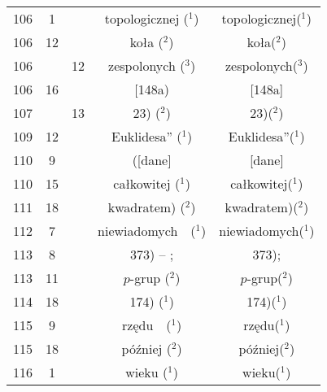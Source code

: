 \documentclass[a4paper,11pt]{article}
\begin{document}
\begin{center}
\begin{tabular}{|c|c|c|c|c|}
    106 &  1 & & topologicznej ($^{ 1 }$) & topologicznej($^{ 1 }$) \\
    106 & 12 & & koła ($^{ 2 }$) & koła($^{ 2 }$) \\
    106 & & 12 & zespolonych ($^{ 3 }$) & zespolonych($^{ 3 }$) \\
    106 & 16 & & [148a) & [148a] \\
    107 & & 13 & 23) ($^{ 2 }$) & 23)($^{ 2 }$) \\
    109 & 12 & & Euklidesa” ($^{ 1 }$) & Euklidesa”($^{ 1 }$) \\
    110 &  9 & & ([dane] & [dane] \\
    110 & 15 & & całkowitej ($^{ 1 }$) & całkowitej($^{ 1 }$) \\
    111 & 18 & & kwadratem) ($^{ 2 }$) & kwadratem)($^{ 2 }$) \\
    112 &  7 & & niewiadomych~~($^{ 1 }$) & niewiadomych($^{ 1 }$) \\
    113 &  8 & & 373) -- ; & 373); \\
    113 & 11 & & $p$-grup ($^{ 2 }$) & $p$-grup($^{ 2 }$) \\
    114 & 18 & & 174) ($^{ 1 }$) & 174)($^{ 1 }$) \\
    115 &  9 & & rzędu~~($^{ 1 }$) & rzędu($^{ 1 }$) \\
    115 & 18 & & później ($^{ 2 }$) & później($^{ 2 }$) \\
    116 &  1 & & wieku ($^{ 1 }$) & wieku($^{ 1 }$) \\
    \hline
  \end{tabular}




\end{center}
\end{document}
